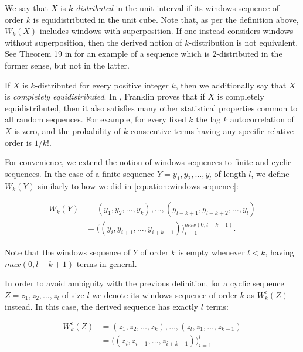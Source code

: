 \documentclass[11pt,a4paper]{tesis}
\theoremstyle{plain}
\theoremstyle{definition}
\begin{document}
We say that $X$ is \textit{$k$-distributed} in the unit interval if its windows sequence of order $k$ is equidistributed in the unit cube. Note that, as per the definition above, $W_k(X)$ includes windows with superposition. If one instead considers windows without superposition, then the derived notion of $k$-distribution is not equivalent. See Theorem 19 in \cite{franklin-1963} for an example of a sequence which is $2$-distributed in the former sense, but not in the latter.

If $X$ is $k$-distributed for every positive integer $k$, then we additionally say that $X$ is \textit{completely equidistributed}. In \cite{franklin-1963}, Franklin proves that if $X$ is completely equidistributed, then it also satisfies many other statistical properties common to all random sequences. For example,  for every fixed $k$ the lag $k$ autocorrelation of $X$ is zero, and the probability of $k$ consecutive terms having any specific relative order is $1 / k!$.

For convenience, we extend the notion of windows sequences to finite and cyclic sequences. In the case of a finite sequence $Y = y_1, y_2, \dots, y_l$ of length $l$, we define $W_k(Y)$ similarly to how we did in \ref{equation:windows-sequence}:

\begin{equation*}
  \begin{aligned}
    W_k(Y) & = (y_1, y_2, \dots, y_k), \dots, (y_{l - k + 1}, y_{l - k + 2}, \dots, y_l) \\
             & = \big( (y_i, y_{i + 1}, \dots, y_{i + k - 1}) \big)_{i = 1}^{max(0, l - k + 1)} \text{.}
  \end{aligned}
\end{equation*}

Note that the windows sequence of $Y$ of order $k$ is empty whenever $l < k$, having $max(0, l - k + 1)$ terms in general.

In order to avoid ambiguity with the previous definition, for a cyclic sequence $Z = z_1, z_2, \dots, z_l$ of size $l$ we denote its windows sequence of order $k$ as $W_k^{c}(Z)$ instead. In this case, the derived sequence has exactly $l$ terms:

\begin{equation*}
  \begin{aligned}
    W_k^{c}(Z) & = (z_1, z_2, \dots, z_k), \dots, (z_l, z_1, \dots, z_{k - 1}) \\
             & = \big( (z_i, z_{i + 1}, \dots, z_{i + k - 1}) \big)_{i = 1}^{l}
  \end{aligned}
\end{equation*}
\end{document}
